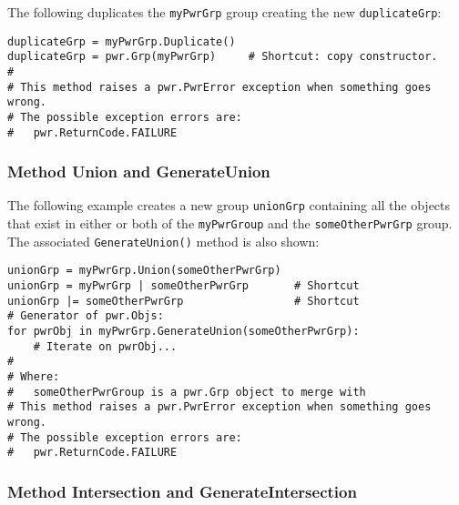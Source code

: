 \documentclass[12pt]{report} %
\begin{document}
\begin{appendices}
The following duplicates the \texttt{myPwrGrp} group creating the new
\texttt{duplicateGrp}:

\begin{center}\begin{minipage}{.95\linewidth}\begin{lstlisting}
duplicateGrp = myPwrGrp.Duplicate()
duplicateGrp = pwr.Grp(myPwrGrp)     # Shortcut: copy constructor.
#
# This method raises a pwr.PwrError exception when something goes wrong.
# The possible exception errors are:
#   pwr.ReturnCode.FAILURE
\end{lstlisting}\end{minipage}\end{center}

\subsubsection{Method Union and GenerateUnion} \label{meth:Union}

The following example creates a new group \texttt{unionGrp} containing all the
objects that exist in either or both of the \texttt{myPwrGroup} and the
\texttt{someOtherPwrGrp} group. The associated \texttt{GenerateUnion()} method is also shown:

\begin{center}\begin{minipage}{.95\linewidth}\begin{lstlisting}
unionGrp = myPwrGrp.Union(someOtherPwrGrp)
unionGrp = myPwrGrp | someOtherPwrGrp       # Shortcut
unionGrp |= someOtherPwrGrp                 # Shortcut
# Generator of pwr.Objs:
for pwrObj in myPwrGrp.GenerateUnion(someOtherPwrGrp):
    # Iterate on pwrObj...
#
# Where:
#   someOtherPwrGroup is a pwr.Grp object to merge with
# This method raises a pwr.PwrError exception when something goes wrong.
# The possible exception errors are:
#   pwr.ReturnCode.FAILURE
\end{lstlisting}\end{minipage}\end{center}

\subsubsection{Method Intersection and GenerateIntersection}
\label{meth:Intersection}


\end{appendices}
\end{document}
